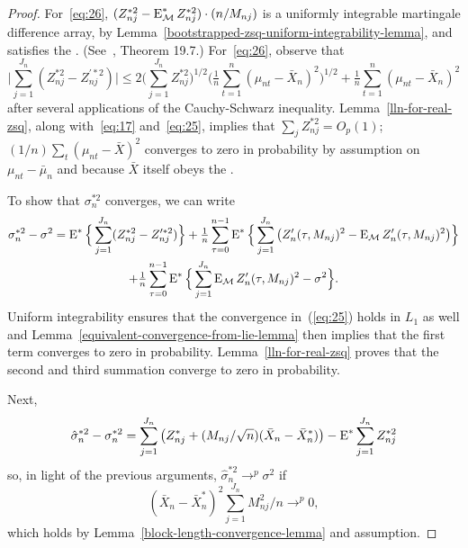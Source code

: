 \documentclass[11pt]{article}
\begin{document}
\begin{proof}
  For~\eqref{eq:26}, $(Z_{nj}^{*2} - \operatorname{E}_{\mathcal{M}}^* Z_{nj}^{*2}) \cdot (n /
  M_{nj})$ is a uniformly integrable martingale difference array, by
  Lemma~\ref{bootstrapped-zsq-uniform-integrability-lemma}, and
  satisfies the \lln. (See~\citealp{Dav:94}, Theorem 19.7.)
  For~\eqref{eq:26}, observe that
  \begin{equation*}
    \Big| \sum_{j=1}^{J_n} (Z_{nj}^{*2} - Z_{nj}^{\prime*2}) \Big| \leq
    2 \Big(\sum_{j=1}^{J_n} Z_{nj}^{*2} \Big)^{1/2}
    \Big(\tfrac{1}{n} \sum_{t=1}^n (\mu_{nt} - \bar X_n)^2\Big)^{1/2}
    + \tfrac{1}{n} \sum_{t=1}^n (\mu_{nt} - \bar X_n)^2
  \end{equation*}
  after several applications of the Cauchy-Schwarz
  inequality. Lemma~\ref{lln-for-real-zsq}, along with~\eqref{eq:17}
  and~\eqref{eq:25}, implies that $\sum_j Z_{nj}^{*2} = O_p(1)$;
  $(1/n) \sum_t (\mu_{nt} - \bar X)^2$ converges to zero in
  probability by assumption on $\mu_{nt} - \bar\mu_n$ and because
  $\bar X$ itself obeys the \lln.

  To show that $\sigma_n^{*2}$ converges, we can write
  \begin{multline*}
    \sigma_n^{*2} - \sigma^2 = \operatorname{E}^*\Big\{ \sum_{j=1}^{J_n} (Z_{nj}^{*2} - Z_{nj}^{\prime*2}) \Big\}
    + \tfrac{1}{n} \sum_{\tau=0}^{n-1} \operatorname{E}^* \Big\{\sum_{j=1}^{J_n}
    \big( Z_{n}^{\prime}(\tau,M_{nj})^2 - \operatorname{E}_{\mathcal{M}} Z_{n}^{\prime}(\tau,M_{nj})^2 \big)\Big\} \\
    + \tfrac{1}{n} \sum_{\tau=0}^{n-1} \operatorname{E}^* \Big\{\sum_{j=1}^{J_n}
    \operatorname{E}_{\mathcal{M}} Z_{n}^{\prime}(\tau,M_{nj})^2  - \sigma^2\Big\}.
  \end{multline*}
  Uniform integrability ensures that the convergence in~(\ref{eq:25})
  holds in $L_1$ as well and
  Lemma~\ref{equivalent-convergence-from-lie-lemma} then implies that
  the first term converges to zero in probability.
  Lemma~\ref{lln-for-real-zsq} proves that the second and third
  summation converge to zero in probability.

  Next,
  \begin{equation*}
    \hat \sigma_n^{*2} - \sigma_n^{*2}
    = \sum_{j=1}^{J_n} \big( Z_{nj}^* + (M_{nj}/\sqrt{n}) (\bar X_n - \bar X_{n}^*) \big)
    - \operatorname{E}^*  \sum_{j=1}^{J_n} Z_{nj}^{*2}
  \end{equation*}
  so, in light of the previous arguments, $\hat\sigma_n^{*2} \to^p \sigma^2$ if
  \begin{equation}
    (\bar X_n - \bar X_n^*)^2 \sum_{j=1}^{J_n} M_{nj}^2/n \to^p 0,
  \end{equation}
  which holds by Lemma~\ref{block-length-convergence-lemma} and
  assumption.
\end{proof}
\end{document}
